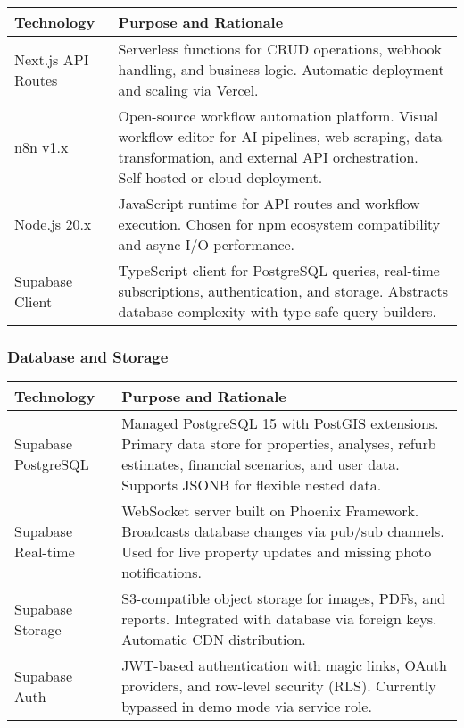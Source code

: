 \documentclass[11pt,a4paper]{article}
\begin{document}
\begin{longtable}{@{}p{3.5cm}p{11cm}@{}}
\toprule
\textbf{Technology} & \textbf{Purpose and Rationale} \\
\midrule
Next.js API Routes & Serverless functions for CRUD operations, webhook handling, and business logic. Automatic deployment and scaling via Vercel. \\
\addlinespace
n8n v1.x & Open-source workflow automation platform. Visual workflow editor for AI pipelines, web scraping, data transformation, and external API orchestration. Self-hosted or cloud deployment. \\
\addlinespace
Node.js 20.x & JavaScript runtime for API routes and workflow execution. Chosen for npm ecosystem compatibility and async I/O performance. \\
\addlinespace
Supabase Client & TypeScript client for PostgreSQL queries, real-time subscriptions, authentication, and storage. Abstracts database complexity with type-safe query builders. \\
\bottomrule
\end{longtable}

\subsubsection{Database and Storage}

\begin{longtable}{@{}p{3.5cm}p{11cm}@{}}
\toprule
\textbf{Technology} & \textbf{Purpose and Rationale} \\
\midrule
Supabase PostgreSQL & Managed PostgreSQL 15 with PostGIS extensions. Primary data store for properties, analyses, refurb estimates, financial scenarios, and user data. Supports JSONB for flexible nested data. \\
\addlinespace
Supabase Real-time & WebSocket server built on Phoenix Framework. Broadcasts database changes via pub/sub channels. Used for live property updates and missing photo notifications. \\
\addlinespace
Supabase Storage & S3-compatible object storage for images, PDFs, and reports. Integrated with database via foreign keys. Automatic CDN distribution. \\
\addlinespace
Supabase Auth & JWT-based authentication with magic links, OAuth providers, and row-level security (RLS). Currently bypassed in demo mode via service role. \\
\bottomrule
\end{longtable}
\end{document}
